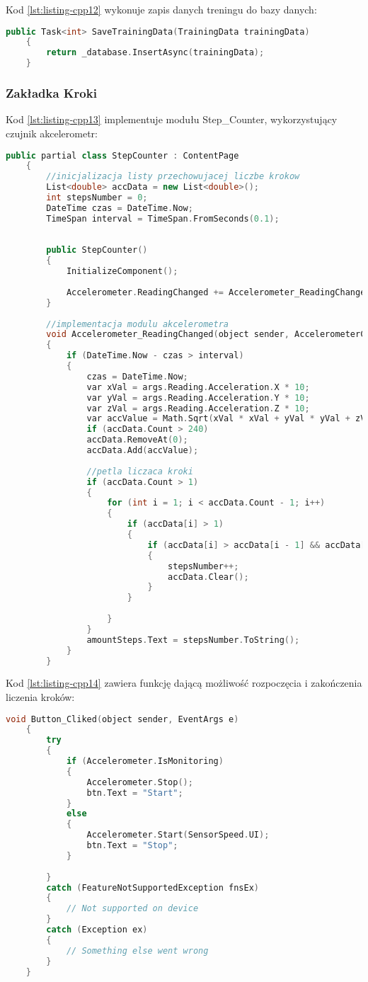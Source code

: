 Kod \ref{lst:listing-cpp12} wykonuje zapis danych treningu do bazy danych:
\begin{lstlisting}[caption=Zapis danych do bazy danych, label={lst:listing-cpp12}, language=C++]
	public Task<int> SaveTrainingData(TrainingData trainingData)      
	{
		return _database.InsertAsync(trainingData);
	}
\end{lstlisting}

\subsubsection{Zakładka Kroki} %

Kod \ref{lst:listing-cpp13} implementuje modułu Step\_Counter, wykorzystujący czujnik akcelerometr:
\begin{lstlisting}[caption=Krakomierz i akcelerometr, label={lst:listing-cpp13}, language=C++]
	public partial class StepCounter : ContentPage
	{
		//inicjalizacja listy przechowujacej liczbe krokow
		List<double> accData = new List<double>();
		int stepsNumber = 0;
		DateTime czas = DateTime.Now;
		TimeSpan interval = TimeSpan.FromSeconds(0.1);
		
		
		public StepCounter()
		{
			InitializeComponent();
			
			Accelerometer.ReadingChanged += Accelerometer_ReadingChanged;
		}
		
		//implementacja modulu akcelerometra
		void Accelerometer_ReadingChanged(object sender, AccelerometerChangedEventArgs args)
		{
			if (DateTime.Now - czas > interval)
			{
				czas = DateTime.Now;
				var xVal = args.Reading.Acceleration.X * 10;
				var yVal = args.Reading.Acceleration.Y * 10;
				var zVal = args.Reading.Acceleration.Z * 10;
				var accValue = Math.Sqrt(xVal * xVal + yVal * yVal + zVal * zVal) - 10;
				if (accData.Count > 240)
				accData.RemoveAt(0);
				accData.Add(accValue);
				
				//petla liczaca kroki
				if (accData.Count > 1)
				{
					for (int i = 1; i < accData.Count - 1; i++)
					{
						if (accData[i] > 1)
						{
							if (accData[i] > accData[i - 1] && accData[i] > accData[i + 1])
							{
								stepsNumber++;
								accData.Clear();
							}
						}
						
					}
				}
				amountSteps.Text = stepsNumber.ToString();
			}
		}
\end{lstlisting}

Kod \ref{lst:listing-cpp14} zawiera funkcję dającą możliwość rozpoczęcia i zakończenia liczenia kroków:
\begin{lstlisting}[caption=Rozpoczęcia i zakończenie liczenia kroków, label={lst:listing-cpp14}, language=C++]
	void Button_Cliked(object sender, EventArgs e) 
	{
		try
		{
			if (Accelerometer.IsMonitoring)
			{
				Accelerometer.Stop();
				btn.Text = "Start";
			}   
			else
			{
				Accelerometer.Start(SensorSpeed.UI);
				btn.Text = "Stop";
			}
			
		}
		catch (FeatureNotSupportedException fnsEx)
		{
			// Not supported on device
		}
		catch (Exception ex)
		{
			// Something else went wrong
		}
	}
\end{lstlisting}